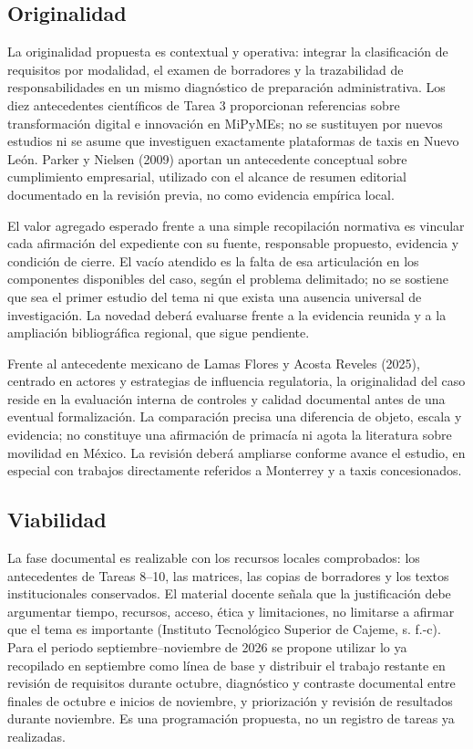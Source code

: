 {\subsection{Originalidad}
La originalidad propuesta es contextual y operativa: integrar la clasificación de requisitos por modalidad, el examen de borradores y la trazabilidad de responsabilidades en un mismo diagnóstico de preparación administrativa. Los diez antecedentes científicos de Tarea 3 proporcionan referencias sobre transformación digital e innovación en MiPyMEs; no se sustituyen por nuevos estudios ni se asume que investiguen exactamente plataformas de taxis en Nuevo León. Parker y Nielsen (2009) aportan un antecedente conceptual sobre cumplimiento empresarial, utilizado con el alcance de resumen editorial documentado en la revisión previa, no como evidencia empírica local.


El valor agregado esperado frente a una simple recopilación normativa es vincular cada afirmación del expediente con su fuente, responsable propuesto, evidencia y condición de cierre. El vacío atendido es la falta de esa articulación en los componentes disponibles del caso, según el problema delimitado; no se sostiene que sea el primer estudio del tema ni que exista una ausencia universal de investigación. La novedad deberá evaluarse frente a la evidencia reunida y a la ampliación bibliográfica regional, que sigue pendiente.


Frente al antecedente mexicano de Lamas Flores y Acosta Reveles (2025), centrado en actores y estrategias de influencia regulatoria, la originalidad del caso reside en la evaluación interna de controles y calidad documental antes de una eventual formalización. La comparación precisa una diferencia de objeto, escala y evidencia; no constituye una afirmación de primacía ni agota la literatura sobre movilidad en México. La revisión deberá ampliarse conforme avance el estudio, en especial con trabajos directamente referidos a Monterrey y a taxis concesionados.


\subsection{Viabilidad}
La fase documental es realizable con los recursos locales comprobados: los antecedentes de Tareas 8–10, las matrices, las copias de borradores y los textos institucionales conservados. El material docente señala que la justificación debe argumentar tiempo, recursos, acceso, ética y limitaciones, no limitarse a afirmar que el tema es importante (Instituto Tecnológico Superior de Cajeme, s. f.-c). Para el periodo septiembre–noviembre de 2026 se propone utilizar lo ya recopilado en septiembre como línea de base y distribuir el trabajo restante en revisión de requisitos durante octubre, diagnóstico y contraste documental entre finales de octubre e inicios de noviembre, y priorización y revisión de resultados durante noviembre. Es una programación propuesta, no un registro de tareas ya realizadas.


}
